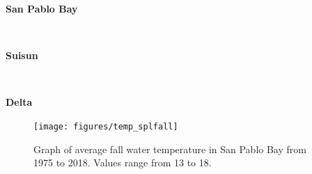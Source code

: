 \documentclass[
]{book}
\begin{document}
\begin{panel-grid}

\begin{columns-nocenter}

\begin{column800}

\textbf{San Pablo Bay}

\end{column800}

\begin{column40}

~

\end{column40}

\begin{column800}

\textbf{Suisun}

\end{column800}

\begin{column40}

~

\end{column40}

\begin{column800}

\textbf{Delta}

\end{column800}

\end{columns-nocenter}

\begin{columns-nocenter}

\begin{column800}

\begin{expand}

\begin{figure}
\texttt{[image: figures/temp\_splfall]} \caption{Graph of average fall water temperature in San Pablo Bay from 1975 to 2018. Values range from 13 to 18.}\label{fig:unnamed-chunk-102}
\end{figure}

\end{expand}

\end{column800}

\begin{column40}

~

\end{column40}


\end{columns-nocenter}
\end{panel-grid}
\end{document}

